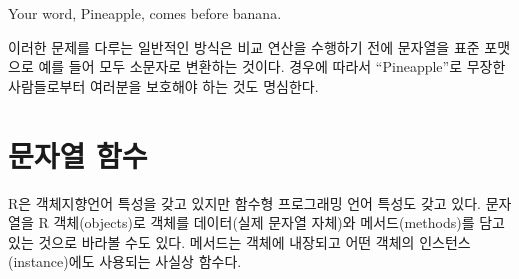 \documentclass[
  letterpaper,
]{book}
\newenvironment{Shaded}{\begin{snugshade}}{\end{snugshade}}
\newcommand{\ExtensionTok}[1]{\textcolor[rgb]{0.00,0.23,0.31}{#1}}
\newcommand{\NormalTok}[1]{\textcolor[rgb]{0.00,0.23,0.31}{#1}}
\begin{document}
\begin{Shaded}
\begin{Highlighting}[]
\ExtensionTok{Your}\NormalTok{ word, Pineapple, comes before banana.}
\end{Highlighting}
\end{Shaded}

이러한 문제를 다루는 일반적인 방식은 비교 연산을 수행하기 전에 문자열을
표준 포맷으로 예를 들어 모두 소문자로 변환하는 것이다. 경우에 따라서
``Pineapple''로 무장한 사람들로부터 여러분을 보호해야 하는 것도
명심한다.

\section{문자열 함수}\label{r-string-method}

R은 객체지향언어 특성을 갖고 있지만 함수형 프로그래밍 언어 특성도 갖고
있다. 문자열을 R 객체(objects)로 객체를 데이터(실제 문자열 자체)와
메서드(methods)를 담고 있는 것으로 바라볼 수도 있다. 메서드는 객체에
내장되고 어떤 객체의 인스턴스(instance)에도 사용되는 사실상 함수다.
   
\end{document}
